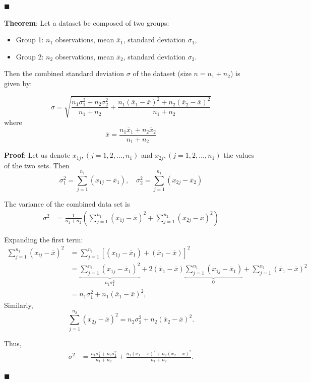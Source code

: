 \documentclass[twoside]{book}
\begin{document}
\begin{enumerate}
\hfill $\blacksquare$

\begin{textbox}
\textbf{Theorem}: Let a dataset be composed of two groups:

\begin{itemize}
  \item Group 1: \( n_1 \) observations, mean \( \overline{x}_1 \), standard deviation \( \sigma_1 \),
  \item Group 2: \( n_2 \) observations, mean \( \overline{x}_2 \), standard deviation \( \sigma_2 \).
\end{itemize}

{Then the combined standard deviation \( \sigma \) of the dataset (size \( n = n_1 + n_2 \)) is given by:}

\[
\sigma = \sqrt{
\frac{n_1 \sigma_1^2 + n_2 \sigma_2^2}{n_1 + n_2} + \frac{n_1 (\overline{x}_1 - \overline{x})^2 + n_2 (\overline{x}_2 - \overline{x})^2}{n_1 + n_2}
}
\]
where
\[
\overline{x} = \frac{n_1 \overline{x}_1 + n_2 \overline{x}_2}{n_1 + n_2}
\]
\end{textbox}

\textbf{Proof}: Let us denote $x_{1j}, (j=1,2,\dots, n_1)$ and $x_{2j}, (j=1,2,\dots, n_1)$ the values of the two sets. Then
$$\sigma_1^2 =\sum_{j=1}^{n_1} (x_{1j} - \overline{x}_1), \quad \sigma_2^2 =\sum_{j=1}^{n_1} (x_{2j} - \overline{x}_2)$$


The variance of the combined data set is
\begin{align*}
\sigma^2 &= \frac{1}{n_1 + n_2} \left(\sum_{j=1}^{n_1} (x_{1j} - \overline{x})^2 + \sum_{j=1}^{n_2} (x_{2j} - \overline{x})^2 \right)
\end{align*}

Expanding the first term:
\begin{align*}
\sum_{j=1}^{n_1} (x_{ij} - \overline{x})^2 &= \sum_{j=1}^{n_1} \left[(x_{1j} - \overline{x}_1) + (\overline{x}_1 - \overline{x})\right]^2 \\
&= \underbrace{\sum_{j=1}^{n_1} (x_{1j} - \overline{x}_1)^2}_{n_1\sigma_1^2} + 2(\overline{x}_1 - \overline{x}) \underbrace{\sum_{j=1}^{n_1} (x_{1j} - \overline{x}_1)}_{0} + \sum_{j=1}^{n_1} (\overline{x}_1 - \overline{x})^2 \\
&= n_1 \sigma_1^2 + n_1 (\overline{x}_1 - \overline{x})^2,
\end{align*}
Similarly,
\[
\sum_{j=1}^{n_2} (x_{2j} - \overline{x})^2 = n_2 \sigma_2^2 + n_2 (\overline{x}_2 - \overline{x})^2.
\]

Thus,
\begin{align*}
\sigma^2 &= \frac{n_1 \sigma_1^2 + n_2 \sigma_2^2}{n_1 + n_2} + \frac{n_1 (\overline{x}_1 - \overline{x})^2 + n_2 (\overline{x}_2 - \overline{x})^2}{n_1 + n_2}.
\end{align*}

\hfill $\blacksquare$

\end{enumerate}
\end{document}
